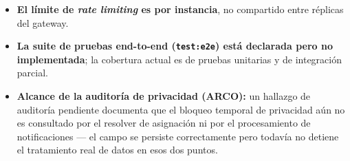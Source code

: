 \documentclass[11pt,a4paper]{article}
\begin{document}
\begin{itemize}[leftmargin=1.2cm]
  \item \textbf{El límite de \emph{rate limiting} es por instancia}, no
    compartido entre réplicas del gateway.
  \item \textbf{La suite de pruebas end-to-end (\texttt{test:e2e}) está
    declarada pero no implementada}; la cobertura actual es de pruebas
    unitarias y de integración parcial.
  \item \textbf{Alcance de la auditoría de privacidad (ARCO):} un hallazgo
    de auditoría pendiente documenta que el bloqueo temporal de privacidad
    aún no es consultado por el resolver de asignación ni por el
    procesamiento de notificaciones — el campo se persiste correctamente
    pero todavía no detiene el tratamiento real de datos en esos dos
    puntos.
\end{itemize}
\end{document}
